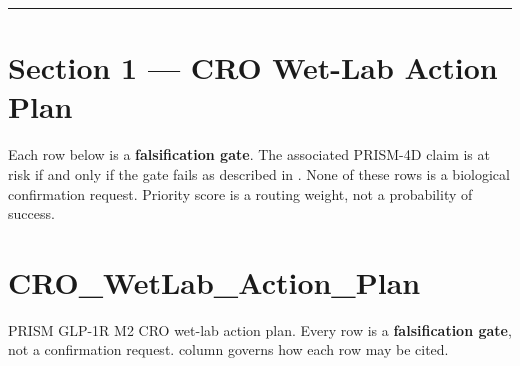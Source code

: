 \documentclass[11pt,a4paper]{article}
\begin{document}
\vspace{2mm}
\hrule
\vspace{4mm}

\hypertarget{section-1--cro-wet-lab-action-plan}{%
\section{Section 1 --- CRO Wet-Lab Action Plan}\label{section-1--cro-wet-lab-action-plan}}

Each row below is a \textbf{falsification gate}. The associated PRISM-4D claim is at risk if and
only if the gate fails as described in \texttt{}. None of
these rows is a biological confirmation request. Priority score is a routing weight, not a
probability of success.

\hypertarget{cro_wetlab_action_plan}{%
\section{CRO\_WetLab\_Action\_Plan}\label{cro_wetlab_action_plan}}

PRISM GLP-1R M2 CRO wet-lab action plan. Every row is a \textbf{falsification gate}, not a
confirmation request. \texttt{} column governs how each row may be
cited.
\end{document}
